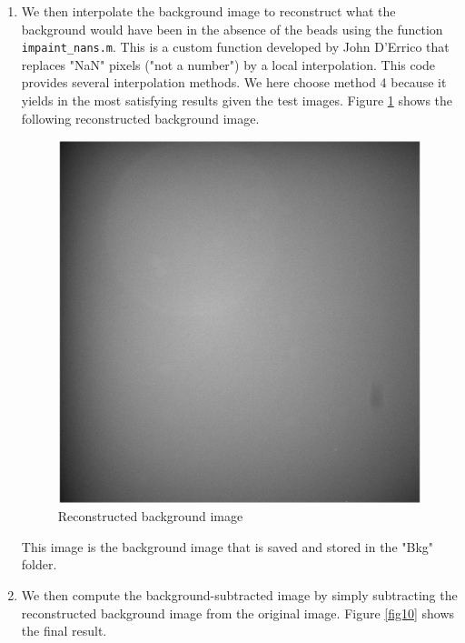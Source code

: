 \documentclass[a4paper]{article}
\begin{document}
\begin{enumerate}
    \item We then interpolate the background image to reconstruct what the background would have been in the absence of the beads using the function \verb|impaint_nans.m|. This is a custom function developed by John D'Errico that replaces "NaN" pixels ("not a number") by a local interpolation. This code provides several interpolation methods. We here choose method 4 because it yields in the most satisfying results given the test images. Figure \ref{fig9} shows the following reconstructed background image.
    \begin{figure}[H]
        \center
        \label{fig9}
        \includegraphics[scale=0.75]{bginterp.png}
        \caption{Reconstructed background image}
    \end{figure}
    This image is the background image that is saved and stored in the "Bkg" folder.

    \item We then compute the background-subtracted image by simply subtracting the reconstructed background image from the original image. Figure \ref{fig10} shows the final result.
    

\end{enumerate}
\end{document}
